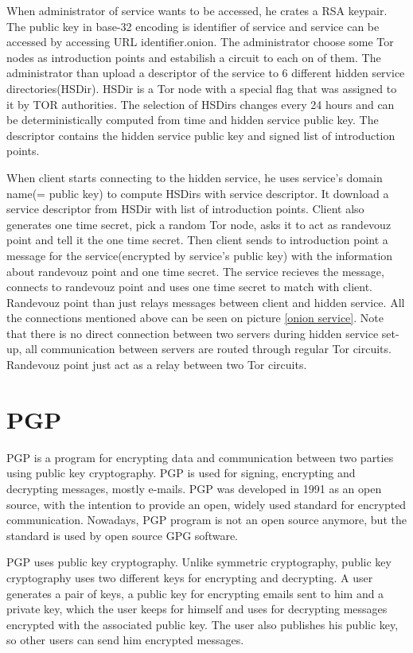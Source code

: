 \documentclass[
  digital, %
  table,   %
  lof,     %
  lot,     %
  oneside
]{fithesis3}
\begin{document}
When administrator of service wants to be accessed, he crates a RSA keypair.
The public key in base-32 encoding is identifier of service and service can be accessed by accessing URL identifier.onion.
The administrator choose some Tor nodes as introduction points and estabilish a circuit to each on of them.
The administrator than upload a descriptor of the service to 6 different hidden service directories(HSDir).
HSDir is a Tor node with a special flag that was assigned to it by TOR authorities.
The selection of HSDirs changes every 24 hours and can be deterministically computed from time and hidden service public key.
The descriptor contains the hidden service public key and signed list of introduction points.

When client starts connecting to the hidden service, he uses service's domain name(= public key)
to compute HSDirs with service descriptor. It download a service descriptor from HSDir with list
of introduction points. Client also generates one time secret, pick a random Tor node, asks
it to act as randevouz point and tell it the one time secret. 
Then client sends to introduction point a message for the service(encrypted by service's public key)
with the information about randevouz point and one time secret. The service recieves the message, connects 
to randevouz point and uses one time secret to match with client.
Randevouz point than just relays messages between client and hidden service.
All the connections mentioned above can be seen on picture \ref{onion service}.
Note that there is no direct connection between two servers during hidden service set-up,
all communication between servers are routed through regular Tor circuits.
Randevouz point just act as a relay between two Tor circuits.

\section{PGP}

PGP \parencite{Zimmermann:1995:OPU:202735} is a program for encrypting data
and communication between two parties using public key cryptography.
PGP is used for signing, encrypting and decrypting messages, mostly e-mails.
PGP was developed in 1991 as an open source, with the intention 
to provide an open, widely used standard for encrypted communication.
Nowadays, PGP program is not an open source anymore, but the standard is used by open source GPG software.

PGP uses public key cryptography. Unlike symmetric cryptography, public key cryptography
uses two different keys for encrypting and decrypting.
A user generates a pair of keys, a public key for encrypting emails sent to him and a private key, which the user
 keeps for himself and uses for decrypting messages encrypted with the associated public key.
 The user also publishes his public key, so other users can send him encrypted messages.
\end{document}
